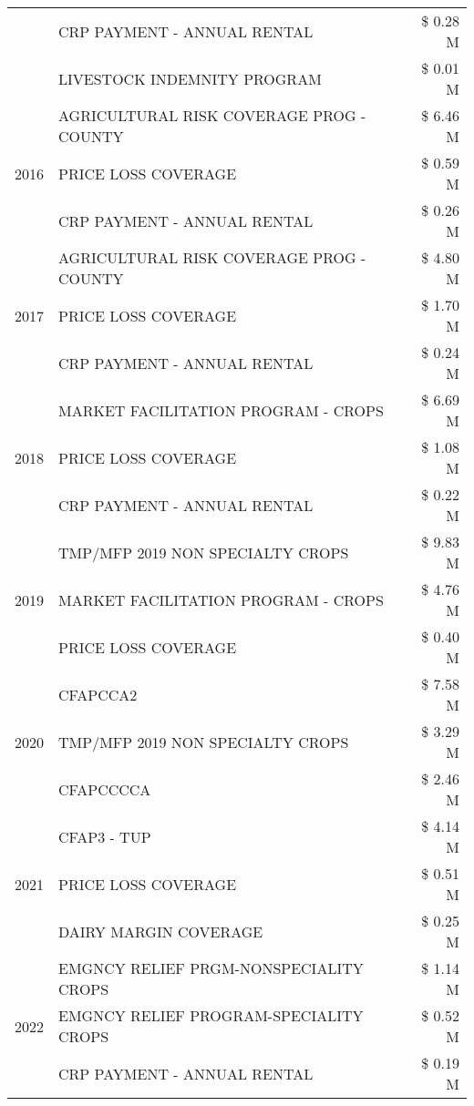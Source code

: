 \begin{tabular}{llr}
 & CRP PAYMENT - ANNUAL RENTAL & \$ 0.28 M \\
 & LIVESTOCK INDEMNITY PROGRAM & \$ 0.01 M \\
\cline{1-3}
\multirow[t]{3}{*}{2016} & AGRICULTURAL RISK COVERAGE PROG - COUNTY & \$ 6.46 M \\
 & PRICE LOSS COVERAGE & \$ 0.59 M \\
 & CRP PAYMENT - ANNUAL RENTAL & \$ 0.26 M \\
\cline{1-3}
\multirow[t]{3}{*}{2017} & AGRICULTURAL RISK COVERAGE PROG - COUNTY & \$ 4.80 M \\
 & PRICE LOSS COVERAGE & \$ 1.70 M \\
 & CRP PAYMENT - ANNUAL RENTAL & \$ 0.24 M \\
\cline{1-3}
\multirow[t]{3}{*}{2018} & MARKET FACILITATION PROGRAM - CROPS & \$ 6.69 M \\
 & PRICE LOSS COVERAGE & \$ 1.08 M \\
 & CRP PAYMENT - ANNUAL RENTAL & \$ 0.22 M \\
\cline{1-3}
\multirow[t]{3}{*}{2019} & TMP/MFP 2019 NON SPECIALTY CROPS & \$ 9.83 M \\
 & MARKET FACILITATION PROGRAM - CROPS & \$ 4.76 M \\
 & PRICE LOSS COVERAGE & \$ 0.40 M \\
\cline{1-3}
\multirow[t]{3}{*}{2020} & CFAPCCA2 & \$ 7.58 M \\
 & TMP/MFP 2019 NON SPECIALTY CROPS & \$ 3.29 M \\
 & CFAPCCCCA & \$ 2.46 M \\
\cline{1-3}
\multirow[t]{3}{*}{2021} & CFAP3 - TUP & \$ 4.14 M \\
 & PRICE LOSS COVERAGE & \$ 0.51 M \\
 & DAIRY MARGIN COVERAGE & \$ 0.25 M \\
\cline{1-3}
\multirow[t]{3}{*}{2022} & EMGNCY RELIEF PRGM-NONSPECIALITY CROPS & \$ 1.14 M \\
 & EMGNCY RELIEF PROGRAM-SPECIALITY CROPS & \$ 0.52 M \\
 & CRP PAYMENT - ANNUAL RENTAL & \$ 0.19 M \\
\cline{1-3}
\bottomrule
\end{tabular}
